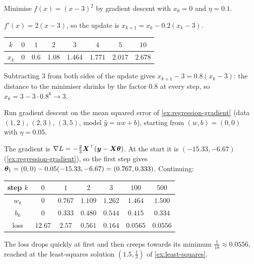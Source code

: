 \begin{example}\label{ex:gd-1d}
Minimise $f(x) = (x - 3)^2$ by gradient descent with $x_0 = 0$ and $\eta = 0.1$.

\sol $f'(x) = 2(x - 3)$, so the update is $x_{k+1} = x_k - 0.2(x_k - 3)$.
\begin{center}
\begin{tabular}{c|ccccccc}
$k$ & $0$ & $1$ & $2$ & $3$ & $4$ & $5$ & $10$\\
\hline
$x_k$ & $0$ & $0.6$ & $1.08$ & $1.464$ & $1.771$ & $2.017$ & $2.678$
\end{tabular}
\end{center}
Subtracting $3$ from both sides of the update gives
$x_{k+1} - 3 = 0.8(x_k - 3)$: the distance to the minimiser shrinks by the factor
$0.8$ at every step, so $x_k = 3 - 3\cdot0.8^k \to 3$.
\end{example}

\begin{example}\label{ex:gd-regression}
Run gradient descent on the mean squared error of \cref{ex:regression-gradient}
(data $(1, 2)$, $(2, 3)$, $(3, 5)$, model $\hat y = wx + b$), starting from
$(w, b) = (0, 0)$ with $\eta = 0.05$.

\sol The gradient is $\nabla L = -\frac23\bm{X}^\top(\bm{y} - \bm{X}\bm{\theta})$. At the start
it is $(-15.33, -6.67)$ (\cref{ex:regression-gradient}), so the first step gives
$\bm{\theta}_1 = (0, 0) - 0.05(-15.33, -6.67) = (0.767, 0.333)$. Continuing:
\begin{center}
\begin{tabular}{c|cccccc}
step $k$ & $0$ & $1$ & $2$ & $3$ & $100$ & $500$\\
\hline
$w_k$ & $0$ & $0.767$ & $1.109$ & $1.262$ & $1.464$ & $1.500$\\
$b_k$ & $0$ & $0.333$ & $0.480$ & $0.544$ & $0.415$ & $0.334$\\
loss & $12.67$ & $2.57$ & $0.561$ & $0.164$ & $0.0565$ & $0.0556$
\end{tabular}
\end{center}
The loss drops quickly at first and then creeps towards its minimum $\frac{1}{18}
\approx 0.0556$, reached at the least-squares solution $(1.5, \frac13)$ of
\cref{ex:least-squares}.
\end{example}

